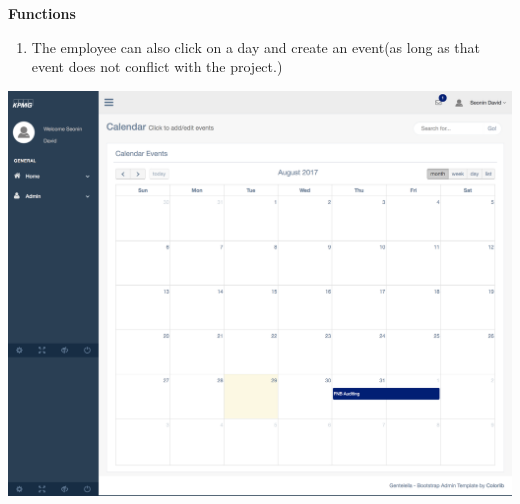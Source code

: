 \documentclass[a4paper,12pt]{article}
\begin{document}
				\textbf{Functions}
				\begin{flushright}
				    \begin{enumerate}
				    	\item The employee can also click on a day and create an event(as long as that event does not conflict with the project.)
				     \end{enumerate}
				\end{flushright}
				\includegraphics[width=0.99\linewidth]{Images/employee_calendar.png}
				
				
\end{document}
